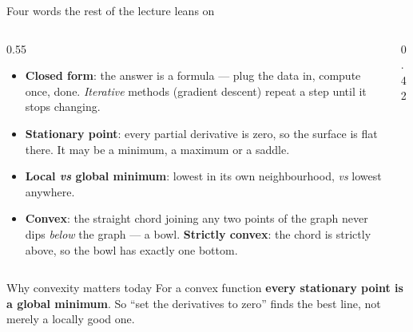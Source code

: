 \documentclass[aspectratio=169]{beamer}
\begin{document}
\begin{frame}[label=words,shrink=6]{Four words the rest of the lecture leans on}
  \begin{columns}[T]
    \begin{column}{0.55\textwidth}
      \small
      \begin{itemize}
        \item \textbf{Closed form}: the answer is a formula --- plug the data
          in, compute once, done. \emph{Iterative} methods (gradient descent)
          repeat a step until it stops changing.
        \item \textbf{Stationary point}: every partial derivative is zero, so
          the surface is flat there. It may be a minimum, a maximum or a
          saddle.
        \item \textbf{Local \emph{vs} global minimum}: lowest in its own
          neighbourhood, \emph{vs} lowest anywhere.
        \item \textbf{Convex}: the straight chord joining any two points of
          the graph never dips \emph{below} the graph --- a bowl.
          \textbf{Strictly convex}: the chord is strictly above, so the bowl
          has exactly one bottom.
      \end{itemize}
    \end{column}
    \begin{column}{0.42\textwidth}
      \centering
    \end{column}
  \end{columns}
  \begin{alertblock}{Why convexity matters today}
    \small For a convex function \textbf{every stationary point is a global
    minimum}. So ``set the derivatives to zero'' finds the best line, not
    merely a locally good one.
  \end{alertblock}
\end{frame}
\end{document}
